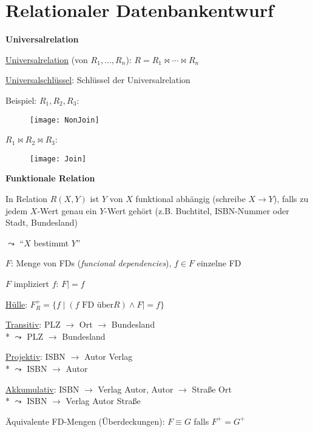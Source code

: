 \section{Relationaler Datenbankentwurf}
\label{sec:abbildenRelational}

\textbf{Universalrelation}
\begin{items}
	\item \underline{Universalrelation} (von \( R_1, \dots, R_n \)): \( R = R_1 \bowtie \cdots \bowtie R_n \)
	\item \underline{Universalschlüssel}: Schlüssel der Universalrelation
	\item Beispiel: \( R_1, R_2, R_3 \):
	\begin{figure}[H]\centering\label{NonJoin}\texttt{[image: NonJoin]}\end{figure}
	\item \quad \( R_1 \bowtie R_2 \bowtie R_3 \):
	\begin{figure}[H]\centering\label{Join}\texttt{[image: Join]}\end{figure}
\end{items}

\textbf{Funktionale Relation}
\begin{items}
	\item In Relation \( R(X,Y) \) ist \( Y \) von \( X \) funktional abhängig (schreibe \( X \to Y \)), falls zu jedem \( X \)-Wert genau ein \( Y \)-Wert gehört (z.B. Buchtitel, ISBN-Nummer oder Stadt, Bundesland)
	\item \( \leadsto \) ``\( X \) bestimmt \( Y \)''
	\item \( F \): Menge von FDs (\emph{funcional dependencies}), \( f \in F \) einzelne FD
	\item \( F \) impliziert \( f \): \( F |= f \)
	\item \underline{Hülle}: \( F_R^+ = \{ f \mid (f \text{ FD über} R) \wedge F |= f \} \)
	\item \underline{Transitiv}: PLZ \( \to \) Ort \( \to \) Bundesland \\* \( \leadsto \) PLZ \( \to \) Bundesland
	\item \underline{Projektiv}: ISBN \( \to \) Autor Verlag \\* \( \leadsto \) ISBN \( \to \) Autor
	\item \underline{Akkumulativ}: ISBN \( \to \) Verlag Autor, Autor \( \to \) Straße Ort \\* \( \leadsto \) ISBN \( \to \) Verlag Autor Straße
	\item Äquivalente FD-Mengen (Überdeckungen): \( F \equiv G \) falls \( F^+ = G^+ \)
\end{items}


